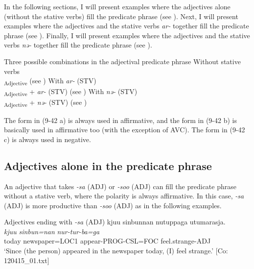   In the following sections, I will present examples where the adjectives alone (without the stative verbs) fill the predicate phrase (see ). Next, I will present examples where the adjectives and the stative verbs \textit{ar-} together fill the predicate phrase (see ). Finally, I will present examples where the adjectives and the stative verbs \textit{nə-} together fill the predicate phrase (see ).

\ea   Three possible combinations in the adjectival predicate phrase\label{ex:9.42}
\ea Without stative verbs\\\textsubscript{Adjective}  (see )
\ex  With \textit{ar-} (STV)\\\textsubscript{Adjective}  + \textit{ar-} (STV)  (see )
\ex With \textit{nə-} (STV)\\\textsubscript{Adjective}  + \textit{nə-} (STV)  (see )
    \z
\z

The form in (9-42 a) is always used in affirmative, and the form in (9-42 b) is basically used in affirmative too (with the exception of AVC). The form in (9-42 c) is always used in negative.

\subsection{Adjectives alone in the predicate phrase}\label{sec:9.2.1}

An adjective that takes \textit{{}-sa} (ADJ) or \textit{{}-soo} (ADJ) can fill the predicate phrase without a stative verb, where the polarity is always affirmative. In this case, \textit{{}-sa} (ADJ) is more productive than \textit{{}-soo} (ADJ) as in the following examples.

\ea   \label{ex:9.43}
\exi{} Adjectives ending with \textit{{}-sa} (ADJ) 
\ea %
 \glll  kjuu  sinbunnan  nutuppaga  utumarasja.\\
      \textit{kjuu}  \textit{sinbun=nan}  \textit{nur-tur-ba=ga}  \textit{}\\
      today  newspaper=LOC1  appear-PROG-CSL=FOC  feel.strange-ADJ\\
      \glt       ‘Since (the person) appeared in the newspaper today, (I) feel strange.’ [Co: 120415\_01.txt]

